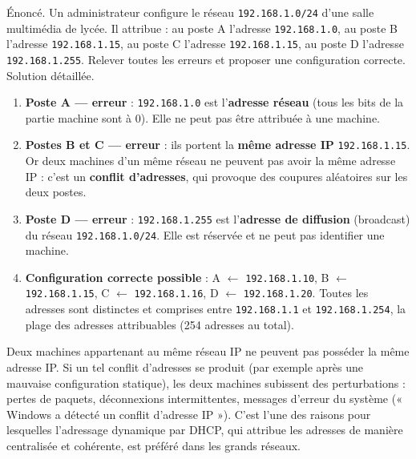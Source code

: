 \documentclass[11pt]{article}
\newcommand{\cle}[1]{{\popxbold\color{popdark}#1}}
\begin{document}
\begin{exoresolu}
Énoncé. Un administrateur configure le réseau \texttt{192.168.1.0/24} d'une salle multimédia de lycée. Il attribue : au poste A l'adresse \texttt{192.168.1.0}, au poste B l'adresse \texttt{192.168.1.15}, au poste C l'adresse \texttt{192.168.1.15}, au poste D l'adresse \texttt{192.168.1.255}. Relever toutes les erreurs et proposer une configuration correcte.
\tcblower
Solution détaillée.
\begin{enumerate}
  \item \textbf{Poste A — erreur} : \texttt{192.168.1.0} est l'\textbf{adresse réseau} (tous les bits de la partie machine sont à 0). Elle ne peut pas être attribuée à une machine.
  \item \textbf{Postes B et C — erreur} : ils portent la \textbf{même adresse IP} \texttt{192.168.1.15}. Or deux machines d'un même réseau ne peuvent pas avoir la même adresse IP : c'est un \textbf{conflit d'adresses}, qui provoque des coupures aléatoires sur les deux postes.
  \item \textbf{Poste D — erreur} : \texttt{192.168.1.255} est l'\textbf{adresse de diffusion} (broadcast) du réseau \texttt{192.168.1.0/24}. Elle est réservée et ne peut pas identifier une machine.
  \item \textbf{Configuration correcte possible} : A $\leftarrow$ \texttt{192.168.1.10}, B $\leftarrow$ \texttt{192.168.1.15}, C $\leftarrow$ \texttt{192.168.1.16}, D $\leftarrow$ \texttt{192.168.1.20}. Toutes les adresses sont distinctes et comprises entre \texttt{192.168.1.1} et \texttt{192.168.1.254}, la plage des adresses attribuables (254 adresses au total).
\end{enumerate}
\end{exoresolu}

\begin{propriete}
Deux machines appartenant au même réseau IP ne peuvent pas posséder la même adresse IP. Si un tel \cle{conflit d'adresses} se produit (par exemple après une mauvaise configuration statique), les deux machines subissent des perturbations : pertes de paquets, déconnexions intermittentes, messages d'erreur du système (« Windows a détecté un conflit d'adresse IP »). C'est l'une des raisons pour lesquelles l'adressage \cle{dynamique} par DHCP, qui attribue les adresses de manière centralisée et cohérente, est préféré dans les grands réseaux.
\end{propriete}
\end{document}

